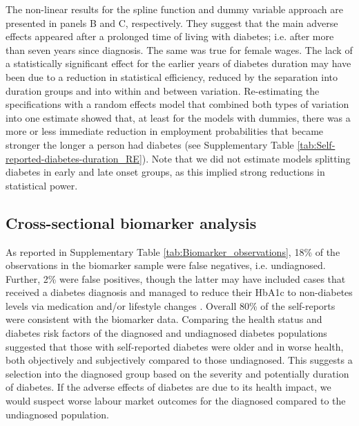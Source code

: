 \documentclass[12pt,english]{article}
\begin{document}
The non-linear results for the spline function and dummy variable approach are  presented in panels B and C, respectively. They suggest that the main adverse effects appeared after a prolonged time of living with diabetes; i.e. after more than seven years since diagnosis. The same was true for female wages. The lack of a statistically significant effect for the earlier years of diabetes duration may have been due to a reduction in statistical efficiency, reduced by the separation into duration groups and into within and between variation. Re-estimating the specifications with a random effects model that combined both types of variation into one estimate showed that, at least for the models with dummies, there was a more or less immediate reduction in employment probabilities that became stronger the longer a person had diabetes (see Supplementary Table \ref{tab:Self-reported-diabetes-duration_RE}). Note that we did not estimate models splitting diabetes in early and late onset groups, as this implied strong reductions in statistical power.

\FloatBarrier

\subsection{Cross-sectional biomarker analysis}


As reported in Supplementary Table \ref{tab:Biomarker_observations}, 18\% of the observations in the biomarker sample were false negatives, i.e. undiagnosed. Further, 2\% were false positives, though the latter may have included cases that received a diabetes diagnosis and managed to reduce their \ac{HbA1c} to non-diabetes levels via medication and/or lifestyle changes \parencite{Flores-Hernandez2015}. Overall 80\% of the self-reports were consistent with the biomarker data. Comparing the health status and diabetes risk factors of the diagnosed and undiagnosed diabetes populations suggested that those with self-reported diabetes were older and in worse health, both objectively and subjectively compared to those undiagnosed. This suggests a selection into the diagnosed group based on the severity and potentially duration of diabetes. If the adverse effects of diabetes are due to its health impact, we would suspect worse labour market outcomes for the diagnosed compared to the undiagnosed population.
\end{document}
